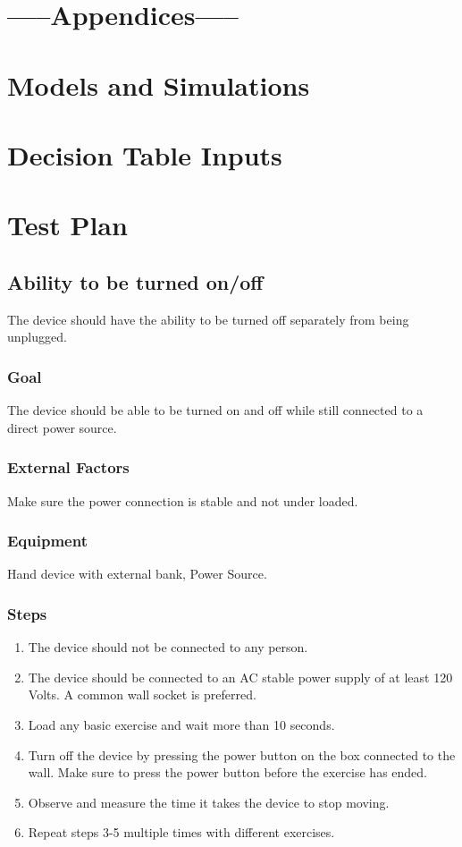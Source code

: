 \documentclass{article}
\begin{document}
\section{\bf{-----Appendices-----}}
\section{Models and Simulations}

\section{Decision Table Inputs}

\section{Test Plan}
\subsection{Ability to be turned on/off}
The device should have the ability to be turned off separately from being unplugged.

\subsubsection{Goal} The device should be able to be turned on and off while still connected to a direct power source.

\subsubsection{External Factors} Make sure the power connection is stable and not under loaded.

\subsubsection{Equipment} Hand device with external bank, Power Source.

\subsubsection{Steps}
\begin{enumerate}
\item The device should not be connected to any person.
\item The device should be connected to an AC stable power supply of at least 120 Volts. A common wall socket is preferred.
\item Load any basic exercise and wait more than 10 seconds.
\item Turn off the device by pressing the power button on the box connected to the wall. Make sure to press the power button before the exercise has ended.
\item Observe and measure the time it takes the device to stop moving.
\item Repeat steps 3-5 multiple times with different exercises.
\end{enumerate}
\end{document}
